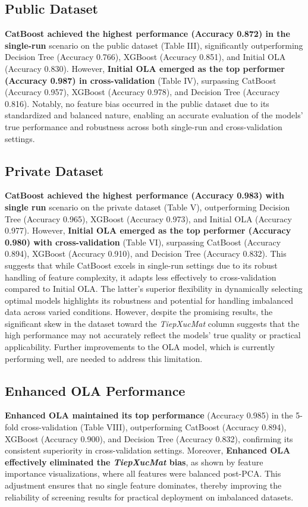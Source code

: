 \documentclass[conference]{IEEEtran}
\begin{document}
\subsection{Public Dataset} \textbf{CatBoost achieved the highest performance (Accuracy 0.872) in the single-run} scenario on the public dataset (Table III), significantly outperforming Decision Tree (Accuracy 0.766), XGBoost (Accuracy 0.851), and Initial OLA (Accuracy 0.830). However, \textbf{Initial OLA emerged as the top performer (Accuracy 0.987) in cross-validation} (Table IV), surpassing CatBoost (Accuracy 0.957), XGBoost (Accuracy 0.978), and Decision Tree (Accuracy 0.816). Notably, no feature bias occurred in the public dataset due to its standardized and balanced nature, enabling an accurate evaluation of the models’ true performance and robustness across both single-run and cross-validation settings.

\subsection{Private Dataset} \textbf{CatBoost achieved the highest performance (Accuracy 0.983) with single run} scenario on the private dataset (Table V), outperforming Decision Tree (Accuracy 0.965), XGBoost (Accuracy 0.973), and Initial OLA (Accuracy 0.977). However, \textbf{Initial OLA emerged as the top performer (Accuracy 0.980) with cross-validation} (Table VI), surpassing CatBoost (Accuracy 0.894), XGBoost (Accuracy 0.910), and Decision Tree (Accuracy 0.832). This suggests that while CatBoost excels in single-run settings due to its robust handling of feature complexity, it adapts less effectively to cross-validation compared to Initial OLA. The latter’s superior flexibility in dynamically selecting optimal models highlights its robustness and potential for handling imbalanced data across varied conditions. However, despite the promising results, the significant skew in the dataset toward the \textit{TiepXucMat} column suggests that the high performance may not accurately reflect the models’ true quality or practical applicability. Further improvements to the OLA model, which is currently performing well, are needed to address this limitation.

\subsection{Enhanced OLA Performance} \textbf{Enhanced OLA maintained its top performance} (Accuracy 0.985) in the 5-fold cross-validation (Table VIII), outperforming CatBoost (Accuracy 0.894), XGBoost (Accuracy 0.900), and Decision Tree (Accuracy 0.832), confirming its consistent superiority in cross-validation settings. Moreover, \textbf{Enhanced OLA effectively eliminated the \textit{TiepXucMat} bias}, as shown by feature importance visualizations, where all features were balanced post-PCA. This adjustment ensures that no single feature dominates, thereby improving the reliability of screening results for practical deployment on imbalanced datasets.
\end{document}
